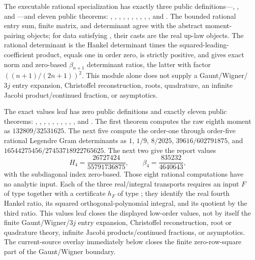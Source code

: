 \documentclass[11pt]{article}
\theoremstyle{definition}
\theoremstyle{remark}
\begin{document}
\begin{remark}
The executable rational specialization  has exactly
three public definitions---,
, and ---and eleven
public theorems:
,
,
,
,
,
,
,
,
,
, and
.
The bounded rational entry sum, finite matrix, and determinant agree with the abstract
moment-pairing objects; for  data satisfying , their
casts are the real up-law objects.  The rational determinant is the Hankel determinant times
the squared-leading-coefficient product, equals one in order zero, is strictly positive,
and gives exact norm and zero-based \(\beta_{n+1}\) determinant ratios, the latter with
factor \(((n+1)/(2n+1))^2\).  This module alone does not supply a Gaunt/Wigner/\(3j\) entry expansion,
Christoffel reconstruction, roots, quadrature, an infinite Jacobi product/continued
fraction, or asymptotics.

The exact values leaf  has zero public
definitions and exactly eleven public theorems:
,
,
,
,
,
,
,
,
,
, and
.
The first theorem computes the raw eighth moment as \(132809/32531625\).  The next five
compute the order-one through order-five rational Legendre Gram determinants as
\(1\), \(1/9\), \(8/2025\), \(39616/602791875\), and
\(16544275456/27453718922765625\).  The next two give the report values
\[
 H_4=\frac{26727424}{55791736875},
 \qquad
 \beta_4=\frac{835232}{4640643},
\]
with the subdiagonal index zero-based.  Those eight rational computations have no
analytic input.  Each of the three real/integral transports requires an input
\(F\) of type  together with a certificate
\(h_F\) of type ; they identify the
real fourth Hankel ratio, its squared orthogonal-polynomial integral, and its quotient
by the third ratio.  This values leaf closes the displayed low-order values, not by
itself the finite Gaunt/Wigner/\(3j\) entry expansion, Christoffel reconstruction,
root or quadrature theory, infinite Jacobi products/continued fractions, or
asymptotics.  The current-source overlay immediately below closes the finite
zero-row-square part of the Gaunt/Wigner boundary.
\end{remark}
\end{document}
